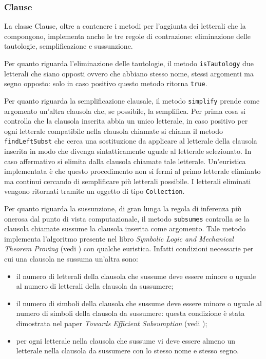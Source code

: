 \documentclass[a4paper,11pt]{article}
\begin{document}
\subsubsection{Clause}
La classe Clause, oltre a contenere i metodi per l'aggiunta dei letterali che la compongono, implementa anche le tre regole di contrazione: eliminazione delle tautologie, semplificazione e sussunzione.\par
Per quanto riguarda l'eliminazione delle tautologie, il metodo \texttt{isTautology} due letterali che siano opposti ovvero che abbiano stesso nome, stessi argomenti ma segno opposto: solo in caso positivo questo metodo ritorna \texttt{true}.\par
Per quanto riguarda la semplificazione clausale, il metodo \texttt{simplify} prende come argomento un'altra clausola che, se possibile, la semplifica. Per prima cosa si controlla che la clausola inserita abbia un unico letterale, in caso positivo per ogni letterale compatibile nella clausola chiamate si chiama il metodo \texttt{findLeftSubst} che cerca una sostituzione da applicare al letterale della clausola inserita in modo che divenga sintatticamente uguale al letterale selezionato. In caso affermativo si elimita dalla clausola chiamate tale letterale. Un'euristica implementata è che questo procedimento non si fermi al primo letterale eliminato ma continui cercando di semplificare più letterali possibile. I letterali eliminati vengono ritornati tramite un oggetto di tipo \texttt{Collection}.\par
Per quanto riguarda la sussunzione, di gran lunga la regola di inferenza più onerosa dal punto di vista computazionale, il metodo \texttt{subsumes} controlla se la clausola chiamate sussume la clausola inserita come argomento. Tale metodo implementa l'algoritmo presente nel libro \emph{Symbolic Logic and Mechanical Theorem Proving} (vedi \cite{ChangLee}) con qualche euristica. Infatti condizioni necessarie per cui una clausola ne sussuma un'altra sono:
\begin{itemize}
\item il numero di letterali della clausola che sussume deve essere minore o uguale al numero di letterali della clausola da sussumere;
\item il numero di simboli della clausola che sussume deve essere minore o uguale al numero di simboli della clausola da sussumere: questa condizione è stata dimostrata nel paper \emph{Towards Efficient Subsumption} (vedi \cite{efficientSubsum});
\item per ogni letterale nella clausola che sussume vi deve essere almeno un letterale nella clausola da sussumere con lo stesso nome e stesso segno.
\end{itemize}
\end{document}
